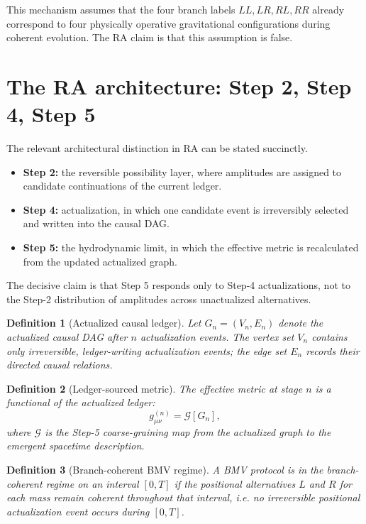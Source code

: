 \documentclass[11pt]{article}
\newtheorem{definition}{Definition}
\begin{document}
This mechanism assumes that the four branch labels $LL,LR,RL,RR$ already correspond to four physically operative gravitational configurations during coherent evolution. The RA claim is that this assumption is false.

\section{The RA architecture: Step 2, Step 4, Step 5}

The relevant architectural distinction in RA can be stated succinctly.

\begin{itemize}[leftmargin=2em]
    \item \textbf{Step 2:} the reversible possibility layer, where amplitudes are assigned to candidate continuations of the current ledger.
    \item \textbf{Step 4:} actualization, in which one candidate event is irreversibly selected and written into the causal DAG.
    \item \textbf{Step 5:} the hydrodynamic limit, in which the effective metric is recalculated from the updated actualized graph.
\end{itemize}

The decisive claim is that Step 5 responds only to Step-4 actualizations, not to the Step-2 distribution of amplitudes across unactualized alternatives.

\begin{definition}[Actualized causal ledger]
Let $G_n = (V_n,E_n)$ denote the actualized causal DAG after $n$ actualization events. The vertex set $V_n$ contains only irreversible, ledger-writing actualization events; the edge set $E_n$ records their directed causal relations.
\end{definition}

\begin{definition}[Ledger-sourced metric]
The effective metric at stage $n$ is a functional of the actualized ledger:
\begin{equation}
 g^{(n)}_{\mu\nu} = \mathcal{G}[G_n],
\end{equation}
where $\mathcal{G}$ is the Step-5 coarse-graining map from the actualized graph to the emergent spacetime description.
\end{definition}

\begin{definition}[Branch-coherent BMV regime]
A BMV protocol is in the \emph{branch-coherent regime} on an interval $[0,T]$ if the positional alternatives $L$ and $R$ for each mass remain coherent throughout that interval, i.e. no irreversible positional actualization event occurs during $[0,T]$.
\end{definition}
\end{document}
